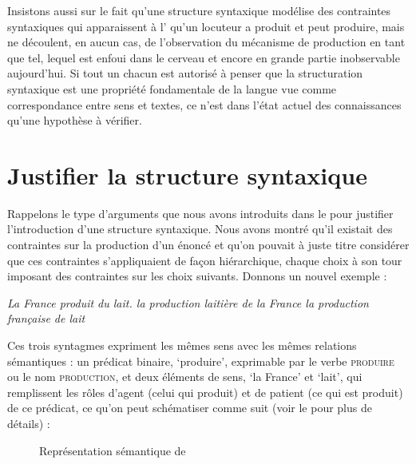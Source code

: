 Insistons aussi sur le fait qu’une structure syntaxique modélise des contraintes syntaxiques qui apparaissent à l’ qu’un locuteur a produit et peut produire, mais ne découlent, en aucun cas, de l’observation du mécanisme de production en tant que tel, lequel est enfoui dans le cerveau et encore en grande partie inobservable aujourd’hui. Si tout un chacun est autorisé à penser que la structuration syntaxique est une propriété fondamentale de la langue vue comme correspondance entre sens et textes, ce n’est dans l’état actuel des connaissances qu’une hypothèse à vérifier.

\section{Justifier la structure syntaxique}\label{sec:3.2.1}

Rappelons le type d’arguments que nous avons introduits dans le  pour justifier l’introduction d’une structure syntaxique. Nous avons montré qu’il existait des contraintes sur la production d’un énoncé et qu’on pouvait à juste titre considérer que ces contraintes s’appliquaient de façon hiérarchique, chaque choix à son tour imposant des contraintes sur les choix suivants. Donnons un nouvel exemple :

\ea\label{ex:lait}
\ea \itshape La France produit du lait.
\ex \itshape la production laitière de la France
\ex \itshape la production française de lait
\z
\z

Ces trois syntagmes expriment les mêmes sens avec les mêmes relations sémantiques : un prédicat binaire, ‘produire’, exprimable par le verbe \textsc{produire} ou le nom \textsc{production,} et deux éléments de sens, ‘la France’ et ‘lait’, qui remplissent les rôles d’agent (celui qui produit) et de patient (ce qui est produit) de ce prédicat, ce qu’on peut schématiser comme suit (voir le  pour plus de détails) :

\begin{figure}
\caption{Représentation sémantique de }
\end{figure}

